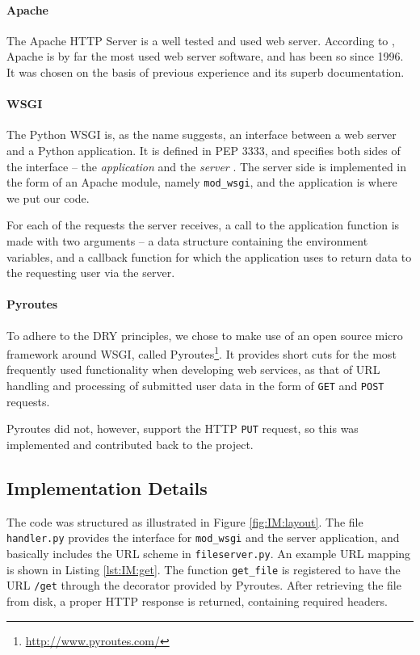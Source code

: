 \documentclass[pdftex,english,10pt,b5paper,twoside]{book}
\begin{document}
\paragraph{Apache} The Apache HTTP Server is a well tested and used web
server. According to \citet{netcraft}, Apache is by far the most used web server
software, and has been so since 1996. It was chosen on the basis of previous
experience and its superb documentation.

\paragraph{\acs{WSGI}} The Python \ac{WSGI} is, as the name suggests, an
interface between a web server and a Python application. It is defined in
\ac{PEP} 3333, and specifies both sides of the interface -- the
\emph{application} and the \emph{server} \cite{PEP-3333}. The server side is
implemented in the form of an Apache module, namely \texttt{mod\_wsgi}, and the
application is where we put our code.

For each of the requests the server receives, a call
to the application function is made with two arguments -- a data structure
containing the environment variables, and a callback function for which the
application uses to return data to the requesting user via the server.

\paragraph{Pyroutes} To adhere to the \ac{DRY} principles, we chose to make use
of an open source micro framework around \ac{WSGI}, called
Pyroutes\footnote{\url{http://www.pyroutes.com/}}. It provides short cuts for the
most frequently used functionality when developing web services, as that of
\ac{URL} handling and processing of submitted user data in the form of
\texttt{GET} and \texttt{POST} requests.

Pyroutes did not, however, support the HTTP \texttt{PUT} request, so this was
implemented and contributed back to the project.


\subsection{Implementation Details}

The code was structured as illustrated in Figure \ref{fig:IM:layout}. The file
\texttt{handler.py} provides the interface for \texttt{mod\_wsgi} and the server
application, and basically includes the \ac{URL} scheme in
\texttt{fileserver.py}. An example \ac{URL} mapping is shown in Listing
\ref{lst:IM:get}. The function \texttt{get\_file} is registered to have the
\ac{URL} \texttt{/get} through the decorator provided by Pyroutes. After
retrieving the file from disk, a proper \ac{HTTP} response is returned,
containing required headers.
\end{document}
